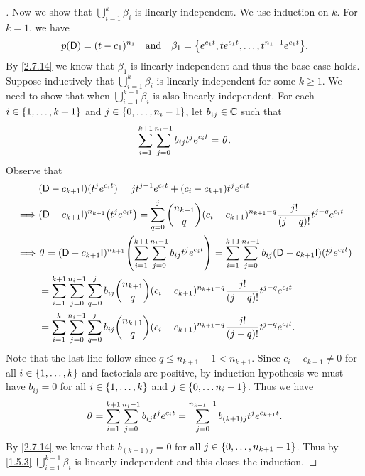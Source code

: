\begin{proof}[]
  Now we show that \(\bigcup_{i = 1}^k \beta_i\) is linearly independent.
  We use induction on \(k\).
  For \(k = 1\), we have
  \[
    p(\Dop) = (t - c_1)^{n_1} \quad \text{and} \quad \beta_1 = \set{e^{c_1 t}, t e^{c_1 t}, \dots, t^{n_1 - 1} e^{c_1 t}}.
  \]
  By \cref{2.7.14} we know that \(\beta_1\) is linearly independent and thus the base case holds.
  Suppose inductively that \(\bigcup_{i = 1}^k \beta_i\) is linearly independent for some \(k \geq 1\).
  We need to show that when \(\bigcup_{i = 1}^{k + 1} \beta_i\) is also linearly independent.
  For each \(i \in \left\lbrace1, \dots, k + 1\right\rbrace\) and \(j \in \left\lbrace0, \dots, n_i - 1\right\rbrace\), let \(b_{i j} \in \mathbb{C}\) such that
  \[
    \sum_{i = 1}^{k + 1} \sum_{j = 0}^{n_i - 1} b_{i j} t^j e^{c_i t} = \mathit{0}.
  \]
  Observe that
  \begin{align*}
             & (\Dop - c_{k + 1} \IT)(t^j e^{c_i t}) = j t^{j - 1} e^{c_i t} + (c_i - c_{k + 1}) t^j e^{c_i t}                                                                                                             \\
    \implies & (\Dop - c_{k + 1} \IT)^{n_{k + 1}} \pa{t^j e^{c_i t}} = \sum_{q = 0}^j \binom{n_{k + 1}}{q} (c_i - c_{k + 1})^{n_{k + 1} - q} \frac{j!}{(j - q)!} t^{j - q} e^{c_i t}                                       \\
    \implies & \zv = (\Dop - c_{k + 1} \IT)^{n_{k + 1}} \pa{\sum_{i = 1}^{k + 1} \sum_{j = 0}^{n_i - 1} b_{i j} t^j e^{c_i t}} = \sum_{i = 1}^{k + 1} \sum_{j = 0}^{n_i - 1} b_{i j} (\Dop - c_{k + 1} \IT)(t^j e^{c_i t}) \\
             & = \sum_{i = 1}^{k + 1} \sum_{j = 0}^{n_i - 1} \sum_{q = 0}^j b_{i j} \binom{n_{k + 1}}{q} (c_i - c_{k + 1})^{n_{k + 1} - q} \frac{j!}{(j - q)!} t^{j - q} e^{c_i t}                                         \\
             & = \sum_{i = 1}^k \sum_{j = 0}^{n_i - 1} \sum_{q = 0}^j b_{i j} \binom{n_{k + 1}}{q} (c_i - c_{k + 1})^{n_{k + 1} - q} \frac{j!}{(j - q)!} t^{j - q} e^{c_i t}.
  \end{align*}
  Note that the last line follow since \(q \leq n_{k + 1} - 1 < n_{k + 1}\).
  Since \(c_i - c_{k + 1} \neq 0\) for all \(i \in \left\lbrace1, \dots, k\right\rbrace\) and factorials are positive, by induction hypothesis we must have \(b_{i j} = 0\) for all \(i \in \left\lbrace1, \dots, k\right\rbrace\) and \(j \in \left\lbrace0, \dots n_i - 1\right\rbrace\).
  Thus we have
  \[
    \mathit{0} = \sum_{i = 1}^{k + 1} \sum_{j = 0}^{n_i - 1} b_{i j} t^j e^{c_i t} = \sum_{j = 0}^{n_{k + 1} - 1} b_{(k + 1) j} t^j e^{c_{k + 1} t}.
  \]
  By \cref{2.7.14} we know that \(b_{(k + 1) j} = 0\) for all \(j \in \left\lbrace0, \dots, n_{k + 1} - 1\right\rbrace\).
  Thus by \cref{1.5.3} \(\bigcup_{i = 1}^{k + 1} \beta_i\) is linearly independent and this closes the induction.
\end{proof}

